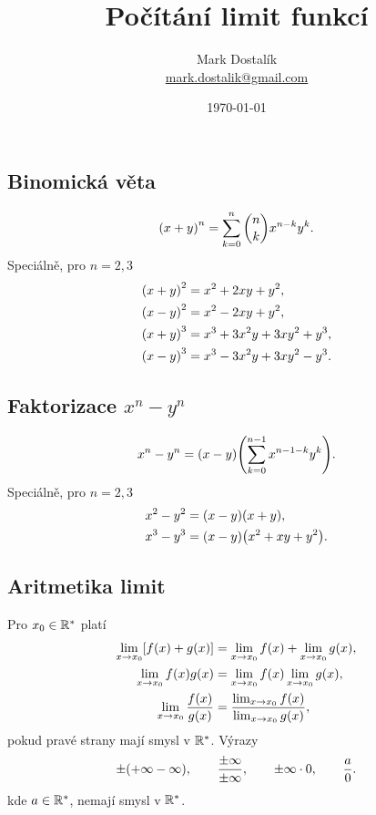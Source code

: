 \documentclass[columns=2]{cheatsheet}
\title{Počítání limit funkcí}
\author{Mark Dostal\'{i}k \\ \href{mailto:mark.dostalik@gmail.com}{mark.dostalik@gmail.com}}
\date{\today}
\begin{document}
\maketitle
\subsection{Binomická věta}
\begin{equation*}
  \parens{x + y}^n = \sum_{k=0}^{n} \binom{n}{k} x^{n - k} y^k.
\end{equation*}
Speciálně, pro $n = 2, 3$
\begin{align*}
  \parens{x + y}^2 
  &= 
  x^2 + 2xy + y^2,
  \\
  \parens{x - y}^2 
  &= 
  x^2 - 2xy + y^2,
  \\  
  \parens{x + y}^3 
  &= 
  x^3 + 3 x^2 y + 3 x y^2 + y^3,
  \\
  \parens{x - y}^3 
  &= 
  x^3 - 3 x^2 y + 3 x y^2 - y^3.
\end{align*}

\subsection{Faktorizace $x^n - y^n$}
\begin{equation*}
  x^n - y^n = \parens{x - y} \parens{\sum_{k=0}^{n - 1} x^{n -1 -k} y^k}.
\end{equation*}
Speciálně, pro $n = 2, 3$
\begin{align*}
  x^2 - y^2 
  &= 
  \parens{x - y} \parens{x + y},
  \\
  x^3 - y^3 
  &= 
  \parens{x - y} \parens{x^2 + xy + y^2}.
\end{align*}

\vfill\null\columnbreak

\subsection{Aritmetika limit}
Pro $x_0 \in \mathbb{R}^*$ platí
\begin{align*}
  \lim_{x \to x_0} \brackets{f(x) + g(x)}
  &=
  \lim_{x \to x_0} f(x) + \lim_{x \to x_0} g(x),
  \\
  \lim_{x \to x_0} f(x) g(x)
  &=
  \lim_{x \to x_0} f(x) \lim_{x \to x_0} g(x),
  \\
  \lim_{x \to x_0} \frac{f(x)}{g(x)}
  &=
  \frac{\lim_{x \to x_0} f(x)}{\lim_{x \to x_0} g(x)},
\end{align*}
pokud pravé strany mají smysl v $\mathbb{R}^*$. Výrazy
\begin{equation*}
  \pm \parens{+ \infty - \infty}, 
  \qquad 
  \frac{\pm \infty}{\pm \infty},
  \qquad
  \pm \infty \cdot 0,
  \qquad
  \frac{a}{0}.
\end{equation*}
kde $a \in \mathbb{R}^*$, nemají smysl v $\mathbb{R}^*$.
\end{document}

